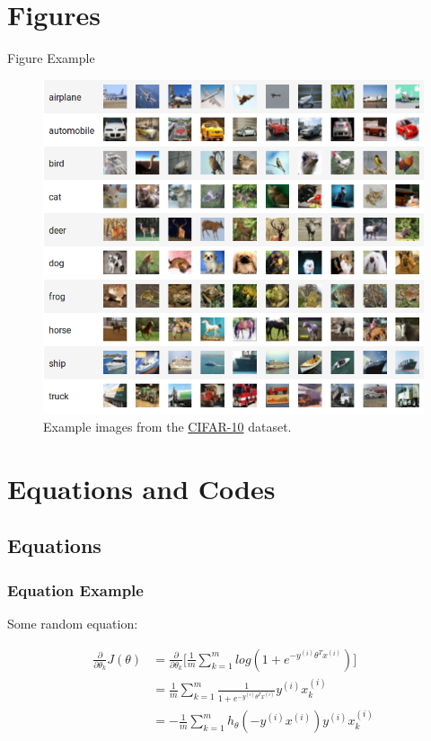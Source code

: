 \documentclass{IFES-beamer}
\begin{document}
\section{Figures}

\begin{frame}{Figure Example} 

\begin{figure}
\centering
\includegraphics[scale=0.25]{images/cifar10.png}
\caption{Example images from the \href{http://www.cs.toronto.edu/~kriz/cifar.html}{CIFAR-10} dataset.}
\end{figure}

\end{frame}

\section{Equations and Codes}
\subsection{Equations}
\begin{frame}
\frametitle{Equation Example}
Some random equation:

\begin{align*}
\frac{\partial}{\partial \theta_k}J(\theta) 
&= \frac{\partial}{\partial \theta_k}\Bigg[\frac{1}{m}\sum_{k=1}^m log(1+e^{-y^{(i)}\theta^Tx^{(i)}})\Bigg] \\
&= \frac{1}{m}\sum_{k=1}^m \frac{1}{1+e^{-y^{(i)}\theta^Tx^{(i)}}}y^{(i)}x_k^{(i)} \\
&= -\frac{1}{m}\sum_{k=1}^m h_\theta(-y^{(i)}x^{(i)})y^{(i)}x_k^{(i)}        
\end{align*}

\end{frame}
\end{document}
